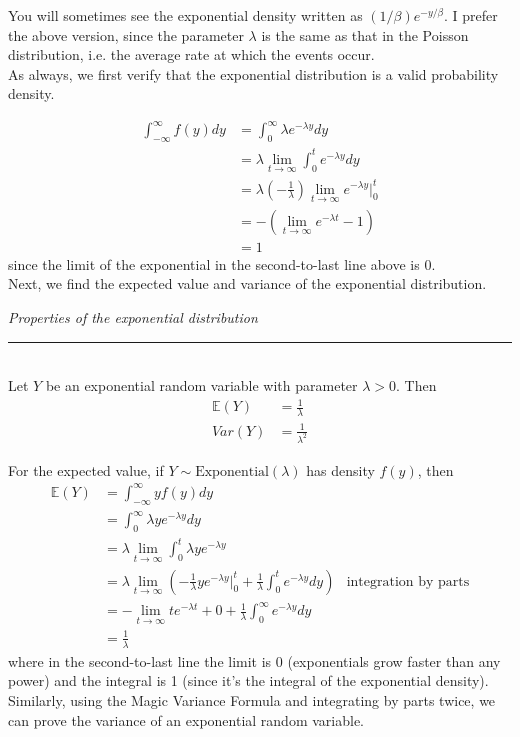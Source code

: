 \documentclass[12pt]{article}
\theoremstyle{definition}
\theoremstyle{remark}
\def\E{{\mathbb E}}
\begin{document}
You will sometimes see the exponential density written as $(1/\beta)e^{-y/\beta}$. I prefer the above version, since the parameter $\lambda$ is the same as that in the Poisson distribution, i.e. the average rate at which the events occur.\\

As always, we first verify that the exponential distribution is a valid probability density.

\begin{align*}
\int_{-\infty}^\infty f(y) dy &= \int_0^\infty \lambda e^{-\lambda y} dy \\
&= \lambda \lim_{t \rightarrow \infty} \int_0^t e^{-\lambda y} dy \\
&= \lambda \left( -\frac{1}{\lambda} \right) \lim_{t \rightarrow \infty} e^{-\lambda y}\Bigr|_0^t \\
&= -\left( \lim_{t\rightarrow\infty} e^{-\lambda t} - 1 \right) \\
&= 1
\end{align*}
since the limit of the exponential in the second-to-last line above is 0.\\

Next, we find the expected value and variance of the exponential distribution.

\begin{framed}
\emph{Properties of the exponential distribution}\\
  \rule{\dimexpr{}\fboxrule}{.1pt} \\
Let $Y$ be an exponential random variable with parameter $\lambda > 0$. Then
\begin{align*}
\E(Y) &= \frac{1}{\lambda}\\
Var(Y) &= \frac{1}{\lambda^2}
\end{align*}
\end{framed}
For the expected value, if $Y \sim \text{Exponential}(\lambda)$ has density $f(y)$, then
\begin{align*}
\E(Y) &= \int_{-\infty}^{\infty} y f(y) dy \\
&= \int_0^{\infty} \lambda y e^{-\lambda y} dy \\
&= \lambda \lim_{t\rightarrow \infty} \int_0^t \lambda y e^{-\lambda y} \\
&= \lambda \lim_{t\rightarrow \infty} \left( -\frac{1}{\lambda}y e^{-\lambda y}\Bigr|_0^t + \frac{1}{\lambda}\int_0^t e^{-\lambda y}dy \right) & \text{integration by parts} \\
&= -\lim_{t\rightarrow \infty} t e^{-\lambda t} + 0 + \frac{1}{\lambda} \int_0^\infty e^{-\lambda y} dy \\
&= \frac{1}{\lambda}
\end{align*}
where in the second-to-last line the limit is 0 (exponentials grow faster than any power) and the integral is 1 (since it's the integral of the exponential density). Similarly, using the Magic Variance Formula and integrating by parts twice, we can prove the variance of an exponential random variable.
\end{document}
